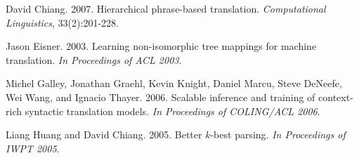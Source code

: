 \documentclass[11pt]{article}
\begin{document}
\begin{thebibliography}{}
%
%


David Chiang. 2007. Hierarchical phrase-based translation. \emph{Computational Linguistics}, 33(2):201-228.

Jason Eisner. 2003. Learning non-isomorphic tree mappings
for machine translation. \emph{In Proceedings of ACL 2003}.

%

Michel Galley, Jonathan Graehl, Kevin Knight, Daniel Marcu, Steve DeNeefe, Wei Wang, and Ignacio
Thayer. 2006. Scalable inference and training of
context-rich syntactic translation models. \emph{In Proceedings of COLING/ACL 2006}.

Liang Huang and David Chiang. 2005.
Better $k$-best parsing.
\emph{In Proceedings of IWPT 2005}.



%



\end{thebibliography}
\end{document}
